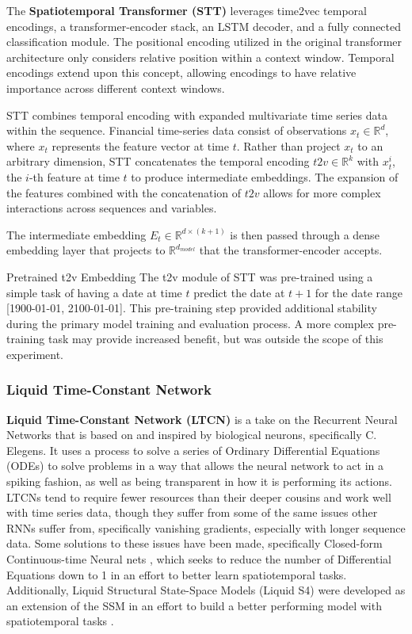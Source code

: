 \documentclass[10pt,twocolumn,letterpaper]{article}
\begin{document}
    The \textbf{Spatiotemporal Transformer (STT)} leverages time2vec temporal encodings, a transformer-encoder stack, an LSTM decoder, and a fully connected classification module. The positional encoding utilized in the original transformer architecture only considers relative position within a context window. Temporal encodings extend upon this concept, allowing encodings to have relative importance across different context windows\cite{STT_Paper,time2vec,STLAT_sota,vaswani_attention_2023,BERT}.

STT combines temporal encoding with expanded multivariate time series data within the sequence. Financial time-series data consist of observations $x_t \in \mathbb{R}^d$, where $x_t$ represents the feature vector at time $t$. Rather than project $x_t$ to an arbitrary dimension, STT concatenates the temporal encoding $t2v \in \mathbb{R}^k$ with $x^i_t$, the $i$-th feature at time $t$ to produce intermediate embeddings. The expansion of the features combined with the concatenation of $t2v$ allows for more complex interactions across sequences and variables.

            The intermediate embedding $E_t \in \mathbb{R}^{d \times (k + 1)}$ is then passed through a dense embedding layer that projects to $\mathbb{R}^{d_{model}}$ that the transformer-encoder accepts.

Pretrained t2v Embedding
The t2v module of STT was pre-trained using a simple task of having a date at time $t$ predict the date at $t+1$ for the date range [1900-01-01, 2100-01-01]. This pre-training step provided additional stability during the primary model training and evaluation process. A more complex pre-training task may provide increased benefit, but was outside the scope of this experiment.

\subsubsection{Liquid Time-Constant Network}

\textbf{Liquid Time-Constant Network (LTCN)} \cite{hasani_liquid_2020} is a take on the Recurrent Neural Networks that is based on and inspired by biological neurons, specifically C. Elegens. It uses a process to solve a series of Ordinary Differential Equations (ODEs) to solve problems in a way that allows the neural network to act in a spiking fashion, as well as being transparent in how it is performing its actions. LTCNs tend to require fewer resources than their deeper cousins and work well with time series data, though they suffer from some of the same issues other RNNs suffer from, specifically vanishing gradients, especially with longer sequence data. Some solutions to these issues have been made, specifically Closed-form Continuous-time Neural nets \cite{CfC_LTC}, which seeks to reduce the number of Differential Equations down to 1 in an effort to better learn spatiotemporal tasks. Additionally, Liquid Structural State-Space Models (Liquid S4) were developed as an extension of the SSM in an effort to build a better performing model with spatiotemporal tasks \cite{hasani2022liquid}.
\end{document}
